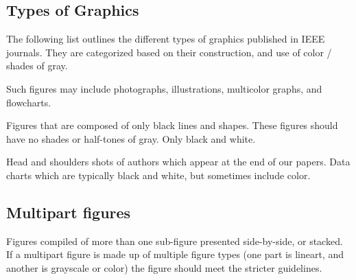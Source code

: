 \documentclass[journal]{IEEEtranTIE}
\begin{document}
\subsection{Types of Graphics}
The following list outlines the different types of graphics published in IEEE journals. They are categorized based on their construction, and use of color / shades of gray.

Such figures may include photographs, illustrations, multicolor graphs, and flowcharts.

Figures that are composed of only black lines and shapes. These figures should have no shades or half-tones of gray. Only black and white.

Head and shoulders shots of authors which appear at the end of our papers.  Data charts which are typically black and white, but sometimes include color.

\subsection{Multipart figures}

Figures compiled of more than one sub-figure presented side-by-side, or stacked. If a multipart figure is made up of multiple figure types (one part is lineart, and another is grayscale or color) the figure should meet the stricter guidelines.
\end{document}
